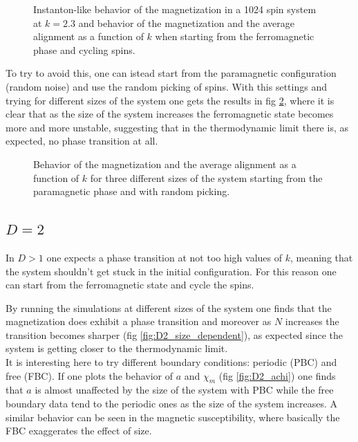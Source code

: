 \documentclass[a4paper, 11pt]{article}
\begin{document}
      \begin{figure}[H]
        \centering
        \caption{Instanton-like behavior of the magnetization in a 1024 spin system at $k = 2.3$ and behavior of the magnetization and the average alignment as a function of $k$ when starting from the ferromagnetic phase and cycling spins.}
        \label{fig:instanton}
      \end{figure}

      To try to avoid this, one can istead start from the paramagnetic configuration (random noise) and use the random picking of spins. With this settings and trying for different sizes of the system one gets the results in fig \ref{fig:D1_size_dependent}, where it is clear that as the size of the system increases the ferromagnetic state becomes more and more unstable, suggesting that in the thermodynamic limit there is, as expected, no phase transition at all.

      \begin{figure}[H]
        \centering
        \caption{Behavior of the magnetization and the average alignment as a function of $k$ for three different sizes of the system starting from the paramagnetic phase and with random picking.}
        \label{fig:D1_size_dependent}
      \end{figure}


    \subsection{$D = 2$}
      In $D > 1$ one expects a phase transition at not too high values of $k$, meaning that the system shouldn't get stuck in the initial configuration. For this reason one can start from the ferromagnetic state and cycle the spins.

      By running the simulations at different sizes of the system one finds that the magnetization does exhibit a phase transition and moreover as $N$ increases the transition becomes sharper (fig \ref{fig:D2_size_dependent}), as expected since the system is getting closer to the thermodynamic limit.\\
      It is interesting here to try different boundary conditions: periodic (PBC) and free (FBC).
      If one plots the behavior of $a$ and $\chi_m$ (fig \ref{fig:D2_achi}) one finds that $a$ is almost unaffected by the size of the system with PBC while the free boundary data tend to the periodic ones as the size of the system increases. A similar behavior can be seen in the magnetic susceptibility, where basically the FBC exaggerates the effect of size.
\end{document}
